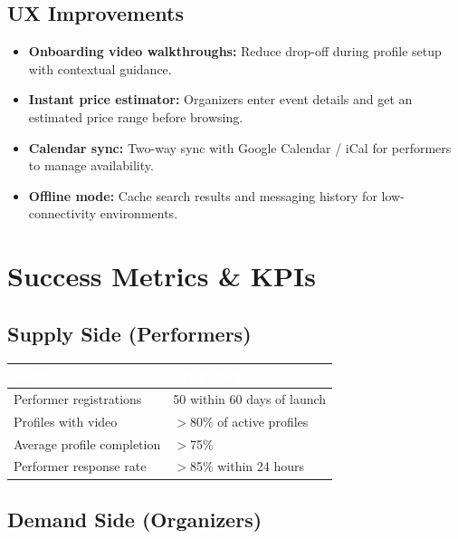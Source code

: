 \documentclass[11pt,a4paper]{article}
\begin{document}
\subsection{UX Improvements}
\begin{itemize}[leftmargin=1.5em]
  \item \textbf{Onboarding video walkthroughs:} Reduce drop-off during profile
        setup with contextual guidance.
  \item \textbf{Instant price estimator:} Organizers enter event details and get
        an estimated price range before browsing.
  \item \textbf{Calendar sync:} Two-way sync with Google Calendar / iCal for
        performers to manage availability.
  \item \textbf{Offline mode:} Cache search results and messaging history for
        low-connectivity environments.
\end{itemize}

\section{Success Metrics \& KPIs}

\subsection{Supply Side (Performers)}

\vspace{0.5em}
\begin{tabularx}{\textwidth}{@{} L{6cm} X @{}}
  \toprule
  \textcolor{white}{\textbf{Metric}} &
  \textcolor{white}{\textbf{MVP Target}} \\
  \midrule
  Performer registrations           & 50 within 60 days of launch \\
  Profiles with video               & $>$80\% of active profiles \\
  Average profile completion        & $>$75\% \\
  Performer response rate           & $>$85\% within 24 hours \\
  \bottomrule
\end{tabularx}
\vspace{0.5em}

\subsection{Demand Side (Organizers)}
\end{document}

